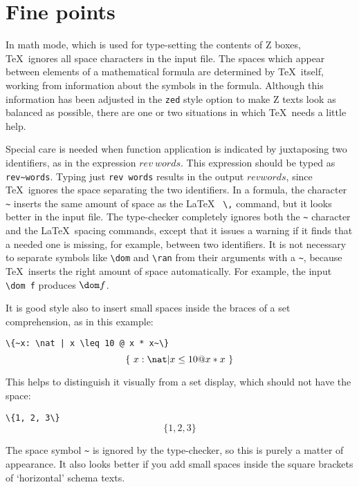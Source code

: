 \documentclass{article}
\def\gives{\endquote\endgroup\egroup}
\begin{document}
\section{Fine points}

In math mode, which is used for type-setting the contents of Z boxes,
\TeX\ ignores all space characters in the input file. The spaces which
appear between elements of a mathematical formula are determined by
\TeX\ itself, working from information about the symbols in the
formula. Although this information has been adjusted in the {\tt zed}
style option to make Z texts look as balanced as possible, there are
one or two situations in which \TeX\ needs a little help.

Special care is needed when function application is indicated by
juxtaposing two identifiers, as in the expression $rev~words$. This
expression should be typed as %
\verb/rev~words/. Typing just %
\verb/rev words/ results in the output $rev words$, since \TeX\ ignores the
space separating the two identifiers.  In a formula, the character
%
\verb/~/ inserts the same amount of space as the \LaTeX\ %
\verb/\,/
command, but it looks better in the input file.  The type-checker
completely ignores both the %
\verb/~/ character and the \LaTeX\ spacing
commands, except that it issues a warning if it finds that a needed
one is missing, for example, between two identifiers.  It is not
necessary to separate symbols like %
\verb/\dom/ and %
\verb/\ran/ from
their arguments with a %
\verb/~/, because \TeX\ inserts the right
amount of space automatically. For example, the input %
\verb/\dom f/
produces $\dom f$.

It is good style also to insert small spaces inside the braces of a
set comprehension, as in this example:
\begin{demo}
%
\verb/\{~x: \nat | x \leq 10 @ x * x~\}/
\gives
\[\{~x: \nat | x \leq 10 @ x * x~\}\]
\end{demo}
This helps to distinguish it visually from a set display, which should
not have the space:
\begin{demo}
%
\verb/\{1, 2, 3\}/
\gives
\[\{1, 2, 3\}\]
\end{demo}
The space symbol %
\verb/~/ is ignored by the type-checker, so this is
purely a matter of appearance.  It also looks better if you add small
spaces inside the square brackets of `horizontal' schema texts.
\end{document}
